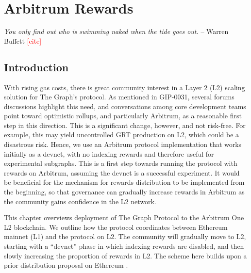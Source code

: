 \chapter[Distribution of Rewards on Arbitrum]{Arbitrum Rewards}
{\justifying

\textit{You only find out who is swimming naked when the tide goes out.} 
\newline \hspace*{10pt}\hfill -- Warren Buffett \textcolor{red}{[cite]}
 

 
\section*{Introduction}
With rising gas costs, there is great community interest in a Layer 2 (L2)  scaling solution for The Graph's protocol. As mentioned in GIP-0031, several forums discussions highlight this need, and conversations among core development teams point toward optimistic rollups, and particularly Arbitrum, as a reasonable first step in this direction. This is a significant change, however, and not risk-free. For example, this may yield uncontrolled GRT production on L2, which could be a disastrous risk.  Hence, we use an Arbitrum protocol implementation that works initially as a devnet, with no indexing rewards and therefore useful for experimental subgraphs. This is a  first step towards running the protocol with rewards on Arbitrum, assuming the devnet is a successful experiment. It would be beneficial for the mechanism for rewards distribution to be implemented from the beginning, so that governance can gradually increase rewards in Arbitrum as the community gains confidence in the L2 network.

This chapter overviews deployment of The Graph Protocol to the Arbitrum One L2  blockchain. We outline how the protocol coordinates between Ethereum mainnet (L1) and  the protocol on L2. The community will gradually move to L2, starting with a ``devnet'' phase in which indexing rewards are disabled, and then slowly increasing the proportion of rewards in L2. 
The scheme here builds upon a prior distribution proposal on Ethereum \cite{batog2018scalable}.

}
